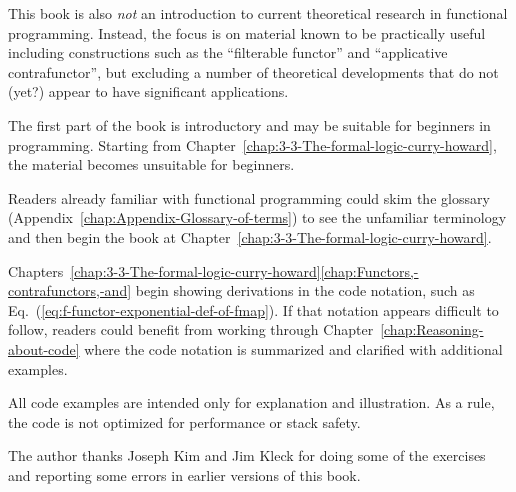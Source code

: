 This book is also \emph{not} an introduction to current theoretical
research in functional programming. Instead, the focus is on material
known to be practically useful \textemdash{} including constructions
such as the ``filterable functor'' and ``applicative contrafunctor'',
but excluding a number of theoretical developments that do not (yet?)
appear to have significant applications.

The first part of the book is introductory and may be suitable for
beginners in programming. Starting from Chapter~\ref{chap:3-3-The-formal-logic-curry-howard},
the material becomes unsuitable for beginners.

Readers already familiar with functional programming could skim the
glossary (Appendix~\ref{chap:Appendix-Glossary-of-terms}) to see
the unfamiliar terminology and then begin the book at Chapter~\ref{chap:3-3-The-formal-logic-curry-howard}.

Chapters~\ref{chap:3-3-The-formal-logic-curry-howard}\textendash \ref{chap:Functors,-contrafunctors,-and}
begin showing derivations in the code notation, such as Eq.~(\ref{eq:f-functor-exponential-def-of-fmap}).
If that notation appears difficult to follow, readers could benefit
from working through Chapter~\ref{chap:Reasoning-about-code} where
the code notation is summarized and clarified with additional examples.

All code examples are intended only for explanation and illustration.
As a rule, the code is not optimized for performance or stack safety.

The author thanks Joseph Kim and Jim Kleck for doing some of the exercises
and reporting some errors in earlier versions of this book.


